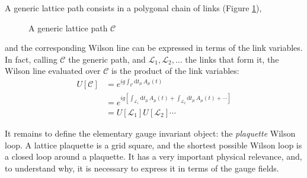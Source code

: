 A generic lattice path consists in a polygonal chain of links (Figure \ref{fig:path}),
\begin{figure}[!htb]
    \centering
    \caption{A generic lattice path $\mathcal C$}
    \label{fig:path}
\end{figure}
and the corresponding Wilson line can be expressed in terms of the link variables.
In fact, calling $\mathcal C$ the generic path, and $\mathcal L_1, \mathcal L_2, \ldots$ the links that form it,
the Wilson line evaluated over $\mathcal C$ is the product of the link variables:
\begin{align*}
    U[\mathcal C] &= e^{ig\int_{\mathcal C}\mathrm dt_\mu\,A_\mu(t)} \\
            &= e^{ig\left[\int_{\mathcal L_1}\mathrm dt_\mu\,A_\mu(t) + \int_{\mathcal L_2}\mathrm dt_\mu\,A_\mu(t) + \cdots \right]} \\
            &= U[\mathcal L_1]U[\mathcal L_2] \cdots
\end{align*}

It remains to define the elementary gauge invariant object: the \emph{plaquette} Wilson loop.
A lattice plaquette is a grid square, and the shortest possible Wilson loop is a closed loop around a plaquette.
It has a very important physical relevance, and, to understand why,
it is necessary to express it in terms of the gauge fields.

